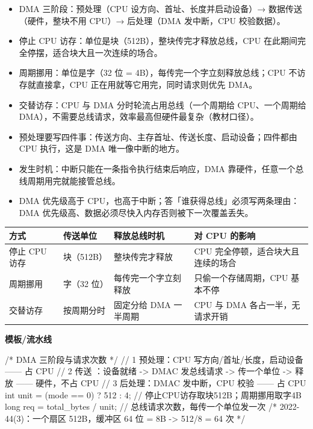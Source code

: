\documentclass[10pt,a4paper]{ctexart}
\begin{document}
\begin{itemize}

\item DMA 三阶段：预处理（CPU 设方向、首址、长度并启动设备）→ 数据传送（硬件，整块不用 CPU）→ 后处理（DMA 发中断，CPU 校验数据）。

\item 停止 CPU 访存：单位是块（512B），整块传完才释放总线，CPU 在此期间完全停摆，适合块大且一次连续的场合。

\item 周期挪用：单位是字（32 位 = 4B），每传完一个字立刻释放总线；CPU 不访存就直接拿，CPU 正在用就等它用完，同时请求则优先 DMA。

\item 交替访存：CPU 与 DMA 分时轮流占用总线（一个周期给 CPU、一个周期给 DMA），不需要总线请求，效率最高但硬件最复杂（教材口径）。

\item 预处理要写四件事：传送方向、主存首址、传送长度、启动设备；四件都由 CPU 执行，这是 DMA 唯一像中断的地方。

\item 发生时机：中断只能在一条指令执行结束后响应，DMA 靠硬件，任意一个总线周期用完就能接管总线。

\item DMA 优先级高于 CPU，也高于中断；答「谁获得总线」必须写两条理由：DMA 优先级高、数据必须尽快入内存否则被下一次覆盖丢失。

\end{itemize}

\begin{center}\small
\begin{tabularx}{\linewidth}{@{}ll>{\raggedright\arraybackslash}X>{\raggedright\arraybackslash}X@{}}
\toprule
方式 & 传送单位 & 释放总线时机 & 对 CPU 的影响 \\
\midrule
停止 CPU 访存 & 块（512B） & 整块传完才释放 & CPU 完全停顿，适合块大且连续的场合 \\
周期挪用 & 字（32 位） & 每传完一个字立刻释放 & 只偷一个存储周期，CPU 基本不停 \\
交替访存 & 按周期分时 & 固定分给 DMA 一半周期 & CPU 与 DMA 各占一半，无请求开销 \\
\bottomrule
\end{tabularx}
\end{center}

\textbf{模板/流水线}

\begin{codebox}
/* DMA 三阶段与请求次数 */
// 1 预处理：CPU 写方向/首址/长度，启动设备        —— 占 CPU
// 2 传送  ：设备就绪 -> DMAC 发总线请求 -> 传一个单位 -> 释放   —— 硬件，不占 CPU
// 3 后处理：DMAC 发中断，CPU 校验                    —— 占 CPU
int unit = (mode == 0) ? 512 : 4;      // 停止CPU访存取块512B；周期挪用取字4B
long req = total_bytes / unit;         // 总线请求次数，每传一个单位发一次
/* 2022-44(3)：一个扇区 512B，缓冲区 64 位 = 8B -> 512/8 = 64 次 */
\end{codebox}
\end{document}
